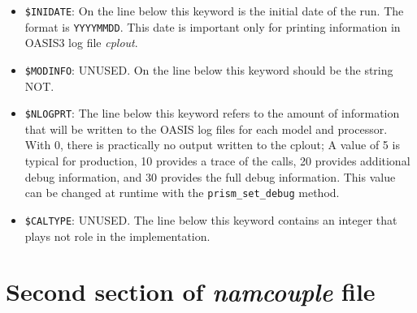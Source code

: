 \begin{itemize}
\item {\tt \$INIDATE}: On the line below this keyword is the initial
  date of the run. The format is {\tt YYYYMMDD}. This date is important only
  for printing information in OASIS3 log file {\it cplout}.

\item {\tt \$MODINFO}: UNUSED.  On the line below this keyword should
be the string NOT.
 
\item {\tt \$NLOGPRT}: The line below this keyword refers to the
  amount of information that will be written to the OASIS log files
  for each model and processor.  With 0, there is practically no output
  written to the cplout; A value of 5 is typical for production, 10
  provides a trace of the calls, 
  20 provides additional debug information, and 
  30 provides the full debug information.  This
  value can be changed at runtime with the {\tt prism\_set\_debug} method.

\item {\tt \$CALTYPE}: UNUSED.  The line below this keyword contains
an integer that plays not role in the implementation.

\end{itemize}


\section{Second section of {\it namcouple} file }
\label{subsec_namcouplesecond}


